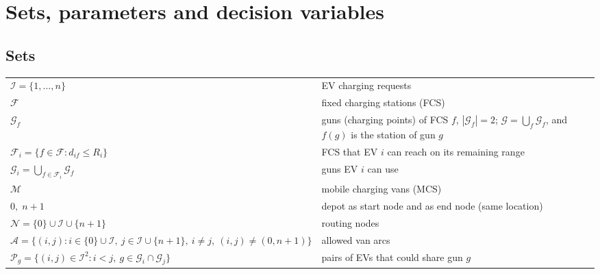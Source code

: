 \documentclass[11pt,a4paper]{article}
\newcommand{\I}{\mathcal{I}}
\newcommand{\F}{\mathcal{F}}
\newcommand{\G}{\mathcal{G}}
\newcommand{\M}{\mathcal{M}}
\newcommand{\N}{\mathcal{N}}
\newcommand{\A}{\mathcal{A}}
\begin{document}
\section{Sets, parameters and decision variables}\label{sec:sets}

\subsection*{Sets}
\begin{tabularx}{\textwidth}{@{}lX@{}}
\toprule
$\I=\{1,\dots,n\}$ & EV charging requests \\
$\F$ & fixed charging stations (FCS) \\
$\G_f$ & guns (charging points) of FCS $f$, $|\G_f|=2$; $\G=\bigcup_{f}\G_f$, and $f(g)$ is the station of gun $g$ \\
$\F_i=\{f\in\F: d_{if}\le R_i\}$ & FCS that EV $i$ can reach on its remaining range \\
$\G_i=\bigcup_{f\in\F_i}\G_f$ & guns EV $i$ can use \\
$\M$ & mobile charging vans (MCS) \\
$0,\;n+1$ & depot as start node and as end node (same location) \\
$\N=\{0\}\cup\I\cup\{n+1\}$ & routing nodes \\
$\A=\{(i,j): i\in\{0\}\cup\I,\ j\in\I\cup\{n+1\},\ i\ne j,\ (i,j)\neq(0,n+1)\}$ & allowed van arcs \\
$\mathcal{P}_g=\{(i,j)\in\I^2: i<j,\ g\in\G_i\cap\G_j\}$ & pairs of EVs that could share gun $g$ \\
\bottomrule
\end{tabularx}
\end{document}

